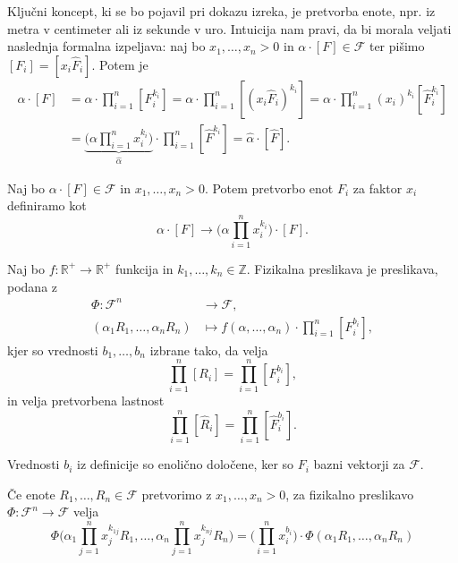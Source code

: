 \documentclass[mat2, tisk]{fmfdelo}
\newcommand{\R}{\mathbb R}
\newcommand{\Z}{\mathbb Z}
\begin{document}
Ključni koncept, ki se bo pojavil pri dokazu izreka, je pretvorba enote, npr.
iz metra v centimeter ali iz sekunde v uro. Intuicija nam pravi, da 
bi morala veljati naslednja formalna izpeljava: naj bo $x_1, \dots, x_n > 0$ in 
$\alpha\cdot[F]\in \mathcal{F}$ ter pišimo $[F_i] = [x_i \hat{F}_i]$. Potem je
\begin{align*}
\alpha \cdot [F] &= \alpha\cdot \prod_{i=1}^n [F_i^{k_i}] = 
\alpha\cdot \prod_{i=1}^n [(x_i\hat{F}_i)^{k_i}] = 
\alpha\cdot \prod_{i=1}^n (x_i)^{k_i} [\hat{F}_i^{k_i}] \\
&= \underbrace{\Big(\alpha\prod_{i=1}^n x_i^{k_i}\Big)}_{\hat{\alpha}} \cdot \prod_{i=1}^n [\hat{F}^{k_i}] = \hat{\alpha}\cdot [\hat{F}].
\end{align*}

\begin{definicija}
Naj bo $\alpha\cdot [F] \in \mathcal{F}$ in $x_1, \dots, x_n > 0$. Potem 
pretvorbo enot $F_i$ za faktor $x_i$ definiramo kot 
\begin{equation*}
 \alpha\cdot [F] \rightarrow \Big(\alpha\prod_{i=1}^n x_i^{k_i}\Big)\cdot [F].
\end{equation*}
\end{definicija}

\begin{definicija}
Naj bo $f: \R^+ \rightarrow \R^+$ funkcija in $k_1, \dots, k_n \in \Z$.
Fizikalna preslikava je preslikava, podana z 
\begin{align*}
\Phi: \mathcal{F}^n &\rightarrow \mathcal{F}, \\
(\alpha_1 R_1, \dots, \alpha_n R_n) &\mapsto f(\alpha, \dots, \alpha_n)\cdot \prod_{i=1}^{n} [F_i^{b_i}],
\end{align*}
kjer so vrednosti $b_1, \dots, b_n$ izbrane tako, da velja 
$$
\prod_{i=1}^{n} [R_i] = \prod_{i=1}^{n} [F_i^{b_i}],
$$
in velja pretvorbena lastnost 
\begin{equation}
\label{pretvorba}
\prod_{i=1}^{n} [\hat{R}_i] = \prod_{i=1}^{n} [\hat{F}_i^{b_i}].
\end{equation}
\end{definicija}

\begin{opomba}
Vrednosti $b_i$ iz definicije so enolično določene, ker so $F_i$ 
bazni vektorji za $\mathcal{F}$.
\end{opomba}

\begin{lema}
\label{lema_pretvorba}
Če enote $R_1, \dots, R_n \in \mathcal{F}$ pretvorimo z $x_1, \dots, x_n > 0$, za 
fizikalno preslikavo 
$\Phi: \mathcal{F}^n \rightarrow \mathcal{F}$ velja 
\begin{equation*}
\Phi\Big(\alpha_1\prod_{j=1}^n x_j^{k_{1j}} R_1, \dots, \alpha_n \prod_{j=1}^n x_j^{k_{nj}} R_n\Big) = \Big(\prod_{i=1}^n x_i^{b_i}\Big)\cdot \Phi(\alpha_1 R_1, \dots, \alpha_n R_n)
\end{equation*}
\end{lema}
\end{document}
